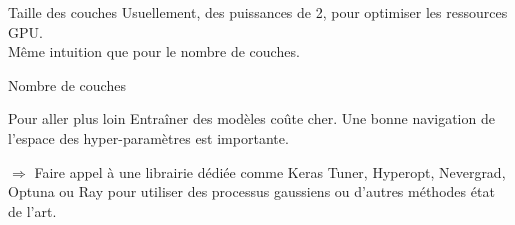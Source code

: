 \begin{frame}{Taille des couches}
  Usuellement, des puissances de 2, pour optimiser les ressources GPU. \\
  Même intuition que pour le nombre de couches.
\end{frame}

\begin{frame}{Nombre de couches}
\end{frame}

\begin{frame}{Pour aller plus loin}
  Entraîner des modèles coûte cher.
  Une bonne navigation de l'espace des hyper-paramètres est importante.

  $\Rightarrow$ Faire appel à une librairie dédiée comme Keras Tuner, Hyperopt, Nevergrad, Optuna ou Ray pour utiliser des processus gaussiens ou d'autres méthodes état de l'art.
\end{frame}
